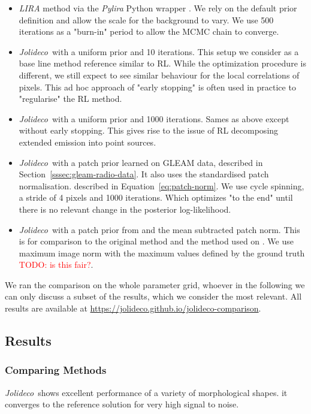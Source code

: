 \documentclass[twocolumn]{aastex631}
\newcommand{\jolideco}{\textit{Jolideco}~}
\newcommand{\todo}[1]{\textcolor{red}{TODO: #1}\PackageWarning{TODO:}{#1!}}
\begin{document}
    \begin{itemize}
        \item \textit{LIRA} method \citep{Esch2004} via the \textit{Pylira} Python wrapper \cite{ scipy_proceeding}. We rely on the default prior definition and allow the scale for the background to vary. We use 500 iterations as a "burn-in" period to allow the MCMC chain to converge.
        \item \jolideco with a uniform prior and 10 iterations. This setup we consider as a base line method reference similar to RL. While the optimization procedure is different, we still expect to see similar behaviour for the local correlations of pixels. This ad hoc approach of "early stopping" is often used in practice to "regularise" the RL method.
        \item \jolideco with a uniform prior and 1000 iterations. Sames as above except without early stopping. This gives rise to the issue of RL decomposing extended emission into point sources. 
        \item \jolideco with a patch prior learned on GLEAM data, described in Section~\ref{sssec:gleam-radio-data}. It also uses the standardised patch normalisation. described in Equation~\ref{eq:patch-norm}. We use cycle spinning, a stride of 4 pixels and 1000 iterations. Which optimizes "to the end" until there is no relevant change in the posterior log-likelihood.
        
        \item \jolideco with a patch prior from \cite{Zoran2011} and the mean subtracted patch norm. This is for comparison to the original method and the method used on \cite{Bouman2016}. We use maximum image norm with the maximum values defined by the ground truth \todo{is this fair?}.
    \end{itemize}

    We ran the comparison on the whole parameter grid, whoever in the following we can only discuss a subset of the results, which we consider the most relevant. All results are available at \url{https://jolideco.github.io/jolideco-comparison}.

    \subsection{Results}
    \subsubsection{Comparing Methods}
    \jolideco shows excellent performance of a variety of morphological shapes. 
    it converges to the reference solution for very high signal to noise.
\end{document}
